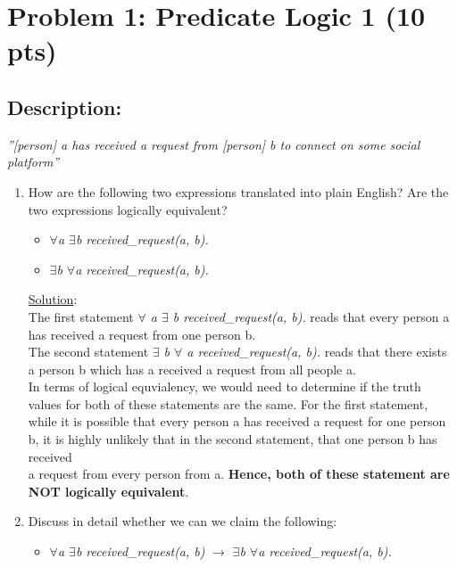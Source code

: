 \newpage

\section{Problem 1: Predicate Logic 1 (10 pts)}
\subsection{Description:}


\noident \textit{''[person] a has received a request from [person] b to connect on some social platform''}

\begin{enumerate}
  \item How are the following two expressions translated into plain English? Are the two
  expressions logically equivalent?
    \begin{itemize}
      \item \emph{$\forall$a $\exists$b received\_request(a, b).}
      \item \emph{$\exists$b $\forall$a received\_request(a, b).}
    
    \end{itemize}

    \noindent \underline{Solution}:\\ The first statement \emph{$\forall$ a $\exists$ b received\_request(a, b).} reads that every person a has received a request from one person b.\\
    The second statement \emph{$\exists$ b $\forall$ a received\_request(a, b).} reads that there exists a person b which has a received a request from all people a.\\
    In terms of logical equvialency, we would need to determine if the truth values for both of these statements are the same. For the first statement, \\ 
    while it is possible that every person a has received a request for one person b, it is highly unlikely that in the second statement, that one person b has received \\ 
    a request from every person from a. \textbf{Hence, both of these statement are NOT logically equivalent}. \\
         
  
  \item  Discuss in detail whether we can we claim the following:\
    \begin{itemize}
      \item[] \emph{$\forall$a $\exists$b received\_request(a, b)} $\rightarrow$ \emph{$\exists$b $\forall$a received\_request(a, b).}
    \end{itemize}


\end{enumerate}
